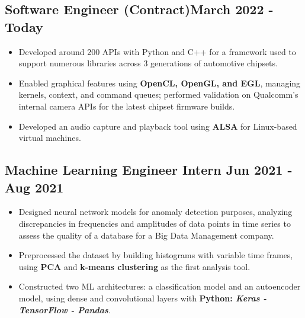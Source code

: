 \documentclass[]{article}
\begin{document}
\vspace{1ex}

\subsection{{Software Engineer (Contract)\hfill{\small{March 2022 - Today}}}}
\vspace{1.5ex}
\begin{itemize}
    \item Developed around 200 APIs with Python and C++ for a framework used to support numerous libraries across 3 generations of automotive chipsets.
    \item Enabled graphical features using \textbf{OpenCL, OpenGL, and EGL}, managing kernels, context, and command queues; performed validation on Qualcomm's internal camera APIs for the latest chipset firmware builds.
    \item Developed an audio capture and playback tool using \textbf{ALSA} for Linux-based virtual machines.
\end{itemize}

\vspace{2ex}

\subsection{Machine Learning Engineer Intern \hfill{\small{Jun 2021 - Aug 2021}}}

\vspace{1.5ex}

\begin{itemize}
    \item Designed neural network models for anomaly detection purposes, analyzing discrepancies in frequencies and amplitudes of data points in time series to assess the quality of a database for a Big Data Management company.
    \item Preprocessed the dataset by building histograms with variable time frames, using \textbf{PCA} and \textbf{k-means clustering} as the first analysis tool.
    \item Constructed two ML architectures: a classification model and an autoencoder model, using dense and convolutional layers with \textbf{Python: \textit{Keras - TensorFlow - Pandas}}.
\end{itemize}
\end{document}
